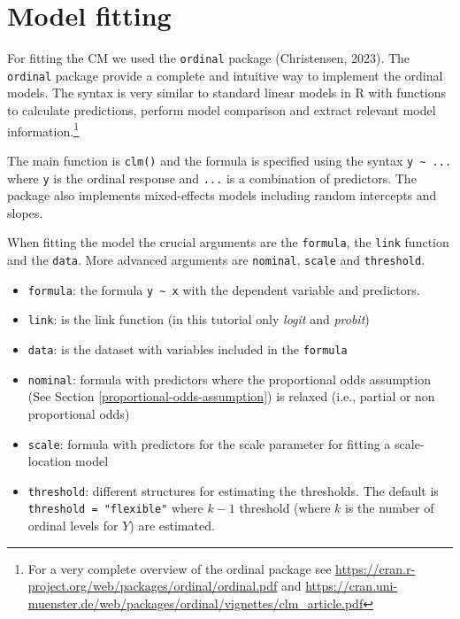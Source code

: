 \documentclass[
  man,floatsintext]{apa6}
\providecommand{\tightlist}{%
  \setlength{\itemsep}{0pt}\setlength{\parskip}{0pt}}
\begin{document}
\normalsize

\scriptsize

\normalsize

\section{Model fitting}\label{model-fitting}

For fitting the CM we used the \texttt{ordinal} package (Christensen, 2023). The \texttt{ordinal} package provide a complete and intuitive way to implement the ordinal models. The syntax is very similar to standard linear models in R with functions to calculate predictions, perform model comparison and extract relevant model information.\footnote{For a very complete overview of the ordinal package see \url{https://cran.r-project.org/web/packages/ordinal/ordinal.pdf} and \url{https://cran.uni-muenster.de/web/packages/ordinal/vignettes/clm_article.pdf}}

The main function is \texttt{clm()} and the formula is specified using the syntax \texttt{y\ \textasciitilde{}\ ...} where \texttt{y} is the ordinal response and \texttt{...} is a combination of predictors. The package also implements mixed-effects models including random intercepts and slopes.

When fitting the model the crucial arguments are the \texttt{formula}, the \texttt{link} function and the \texttt{data}. More advanced arguments are \texttt{nominal}, \texttt{scale} and \texttt{threshold}.

\begin{itemize}
\tightlist
\item
  \texttt{formula}: the formula \texttt{y\ \textasciitilde{}\ x} with the dependent variable and predictors.
\item
  \texttt{link}: is the link function (in this tutorial only \emph{logit} and \emph{probit})
\item
  \texttt{data}: is the dataset with variables included in the \texttt{formula}
\item
  \texttt{nominal}: formula with predictors where the proportional odds assumption (See Section \ref{proportional-odds-assumption}) is relaxed (i.e., partial or non proportional odds)
\item
  \texttt{scale}: formula with predictors for the scale parameter for fitting a scale-location model
\item
  \texttt{threshold}: different structures for estimating the thresholds. The default is \texttt{threshold\ =\ "flexible"} where \(k - 1\) threshold (where \(k\) is the number of ordinal levels for \(Y\)) are estimated.
\end{itemize}
\end{document}
